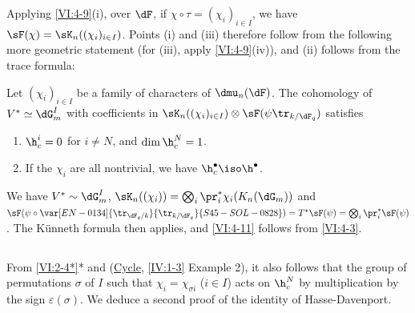 Applying \ref{VI:4-9}(i), over $\dF$, if $\chi\circ \tau=(\chi_i)_{i\in I}$, 
we have $\sF(\chi) = \sK_n((\chi_i)_{i\in I})$. Points (i) and (iii) 
therefore follow from the following more geometric statement (for (iii), 
apply \ref{VI:4-9}(iv)), and (ii) follows from the trace formula: 





\begin{proposition_}\label{VI:4-11}
Let $(\chi_i)_{i\in I}$ be a family of characters of $\dmu_n(\dF)$. The 
cohomology of $V^\ast\simeq \dG_m^I$ with coefficients in 
$\sK_n((\chi_i)_{i\in I})\otimes \sF(\psi\tr_{k/\dF_q})$ satisfies 
\begin{enumerate}[\indent (i)]
  \item $\h_c^i{}=0$ for $i\ne N$, and $\dim \h_c^N{} = 1$. 
  \item If the $\chi_i$ are all nontrivial, we have 
    $\h_c^\bullet{}\iso \h^\bullet$. 
\end{enumerate}
\end{proposition_}

We have $V^\ast\sim \dG_m^I$, 
$\sK_n((\chi_i)) = \bigotimes_i \pr_i^\ast \chi_i(K_n(\dG_m))$ and 
$\sF(\psi\circ \var[EN-0134]{\tr_{\dF_q/k}}{\tr_{k/\dF_q}}{S45-SOL-0828})=T^\ast \sF(\psi) = \bigotimes_i \pr_i^\ast \sF(\psi)$. 
The K\"unneth formula then applies, and \ref{VI:4-11} follows from 
\ref{VI:4-3}. 





\subsection{}\label{VI:4-12}

From \ref{VI:2-4*}* and (\hyperref[IV]{Cycle}, \ref{IV:1-3} Example 2), it also follows 
that the group of permutations $\sigma$ of $I$ such that 
$\chi_i = \chi_{\sigma i}$ ($i\in I$) acts on $\h_c^N$ by multiplication by 
the sign $\varepsilon(\sigma)$. We deduce a second proof 
of the identity of Hasse-Davenport. 

